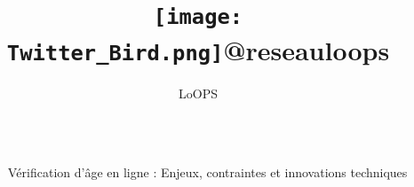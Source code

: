 \documentclass[final]{beamer}
\title{\texttt{[image: Twitter\_Bird.png]}@reseauloops}%
\author{LoOPS} %
\institute{@reseauloops} %
\newlength{\sepwid}
\newlength{\twocolwid}
\begin{document}

\setlength{\belowcaptionskip}{3ex} %
\setlength\belowdisplayshortskip{3ex} %


\begin{frame}[t] %

	\begin{columns}[t] %

		\begin{column}{\sepwid}\end{column} %

		\begin{column}{\twocolwid} %


			\begin{alertblock}{\Large{V\'{e}rification d'\^{a}ge en ligne : Enjeux, contraintes et innovations techniques}}
			\end{alertblock}

			\vspace{-2in}
			\begin{figure}%
				\centering
				\qquad
			\end{figure}


\end{column}
\end{columns}
\end{frame}
\end{document}
